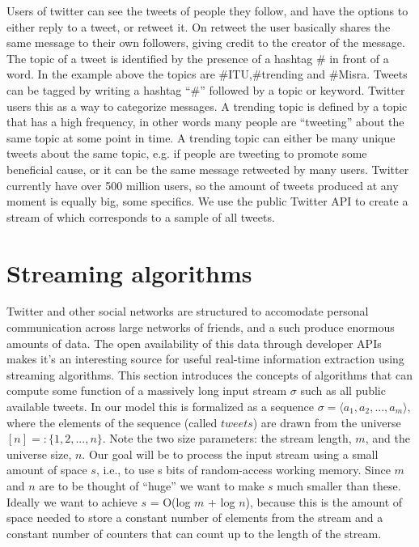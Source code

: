 \documentclass[12pt]{article}
\begin{document}
Users of twitter can see the tweets of people they follow, and have the options to either reply to a tweet, or retweet it. On retweet the user basically shares the same message to their own followers, giving credit to the creator of the message.
The topic of a tweet is identified by the presence of a hashtag \# in front of a word. In the example above the topics are \#ITU,\#trending and \#Misra.
Tweets can be tagged by writing a hashtag ``\#'' followed by a topic or keyword. Twitter users this as a way to categorize messages.
A trending topic is defined by a topic that has a high frequency, in other words many people are ``tweeting'' about the same topic at some point in time. A trending topic can either be many unique tweets about the same topic, e.g. if people are tweeting to promote some beneficial cause, or it can be the same message retweeted by many users.
Twitter currently have over 500 million users, so the amount of tweets produced at any moment is equally big, some specifics. We use the public Twitter API to create a stream of which corresponds to a sample of all tweets. 

\section{Streaming algorithms}\label{related work}
Twitter and other social networks are structured to accomodate personal communication across large networks of friends, and a such produce enormous amounts of data. The open availability of this data through developer APIs makes it's an interesting source for useful real-time information extraction using streaming algorithms. \cite{genderprediction} 
This section introduces the concepts of algorithms that can compute some function of a massively long input stream $\sigma$ such as all public available tweets. In our model this is formalized as a sequence $\sigma = \langle a_{1}, a_{2},...,a_{m}\rangle $, where the elements of the sequence (called $tweets$) are drawn from the universe $[n] =: \{1, 2,..., n\}$. Note the two size parameters: the stream length, $m$, and the universe size, $n$.
Our goal will be to process the input stream using a small amount of space $s$, i.e., to use s bits of random-access working memory. Since $m$ and $n$ are to be thought of ``huge'' we want to make $s$ much smaller than these. Ideally we want to achieve $s$ = O(log $m$ + log $n$), because this is the amount of space needed to store a constant number of elements from the stream and a constant number of counters that can count up to the length of the stream. \cite{Amit}
\end{document}
